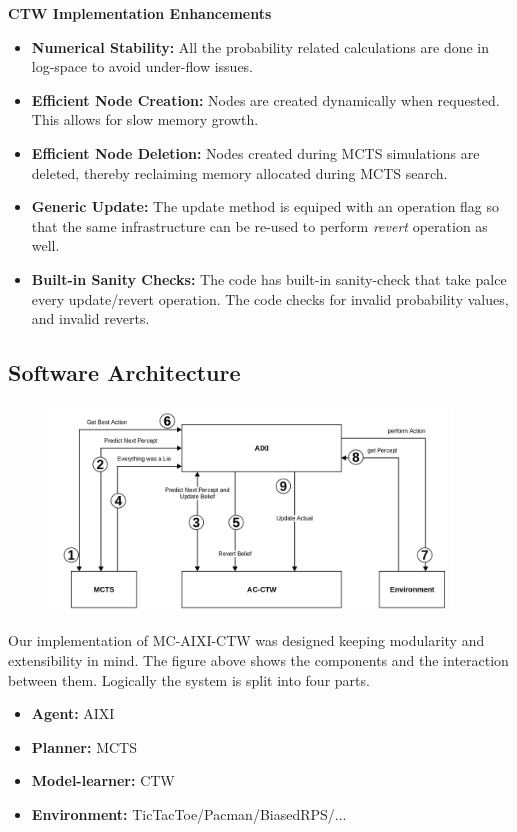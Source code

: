 \documentclass{article}
\theoremstyle{definition}
\newtheorem{primary statistics}[definition]{Primary Statistics}
\newtheorem{auxiliary statistics}[definition]{Auxiliary Statistics}
\begin{document}
\begin{itemize}
    \textbf{CTW Implementation Enhancements}
    \begin{itemize}
        \item \textbf{Numerical Stability:} All the probability related calculations are done in log-space to avoid under-flow issues.
        \item \textbf{Efficient Node Creation:} Nodes are created dynamically when requested. This allows for slow memory growth.
        \item \textbf{Efficient Node Deletion:} Nodes created during MCTS simulations are deleted, thereby reclaiming memory allocated during MCTS search.
        \item \textbf{Generic Update:} The update method is equiped with an operation flag so that the same infrastructure can be re-used to perform \textit{revert} operation as well.
        \item \textbf{Built-in Sanity Checks:} The code has built-in sanity-check that take palce every update/revert operation. The code checks for invalid probability values, and invalid reverts.
    \end{itemize}
\end{itemize}


\subsection{Software Architecture}

\begin{figure}[h]
    \centering
    \includegraphics[height=5.5cm]{soft_arch_crop}    
\end{figure}

Our implementation of MC-AIXI-CTW was designed keeping modularity and extensibility in mind. The figure above shows the components and the interaction between them. Logically the system is split into four parts. 
\begin{itemize}
    \item \textbf{Agent: } AIXI
    \item \textbf{Planner: } MCTS
    \item \textbf{Model-learner: } CTW
    \item \textbf{Environment: } TicTacToe/Pacman/BiasedRPS/...
\end{itemize}
\end{document}
